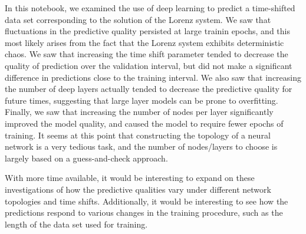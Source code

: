 \documentclass[11pt]{article}
\begin{document}
    In this notebook, we examined the use of deep learning to predict a
time-shifted data set corresponding to the solution of the Lorenz
system. We saw that fluctuations in the predictive quality persisted at
large trainin epochs, and this most likely arises from the fact that the
Lorenz system exhibits deterministic chaos. We saw that increasing the
time shift parameter tended to decrease the quality of prediction over
the validation interval, but did not make a significant difference in
predictions close to the training interval. We also saw that increasing
the number of deep layers actually tended to decrease the predictive
quality for future times, suggesting that large layer models can be
prone to overfitting. Finally, we saw that increasing the number of
nodes per layer significantly improved the model quality, and caused the
model to require fewer epochs of training. It seems at this point that
constructing the topology of a neural network is a very tedious task,
and the number of nodes/layers to choose is largely based on a
guess-and-check approach.

With more time available, it would be interesting to expand on these
investigations of how the predictive qualities vary under different
network topologies and time shifts. Additionally, it would be
interesting to see how the predictions respond to various changes in the
training procedure, such as the length of the data set used for
training.


    
    
    
    
\end{document}
